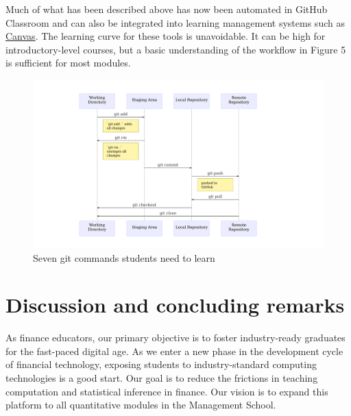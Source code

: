 \documentclass{article}
\begin{document}
Much of what has been described above has now been automated in GitHub
Classroom and can also be integrated into learning management systems
such as
\href{https://docs.github.com/en/education/manage-coursework-with-github-classroom/teach-with-github-classroom/connect-a-learning-management-system-to-github-classroom}{Canvas}.
The learning curve for these tools is unavoidable. It can be high for
introductory-level courses, but a basic understanding of the workflow in
Figure 5 is sufficient for most modules.

\begin{figure}

{\centering \includegraphics{qrap_paper_files/figure-latex/github-workflow-1} 

}

\caption{Seven git commands students need to learn}\label{fig:github-workflow}
\end{figure}

\hypertarget{discussion-and-concluding-remarks}{%
\section{Discussion and concluding
remarks}\label{discussion-and-concluding-remarks}}

As finance educators, our primary objective is to foster industry-ready
graduates for the fast-paced digital age. As we enter a new phase in the
development cycle of financial technology, exposing students to
industry-standard computing technologies is a good start. Our goal is to
reduce the frictions in teaching computation and statistical inference
in finance. Our vision is to expand this platform to all quantitative
modules in the Management School.
\end{document}
